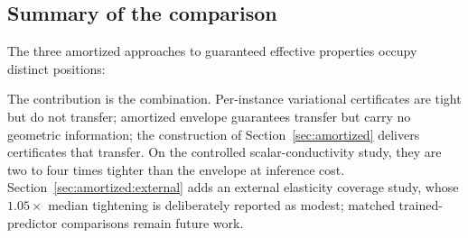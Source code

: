 \subsection{Summary of the comparison}
\label{sec:tightness:summary}

The three amortized approaches to guaranteed effective properties occupy
distinct positions:

\begin{center}
\end{center}

The contribution is the combination. Per-instance variational certificates
are tight but do not transfer; amortized envelope guarantees transfer but
carry no geometric information; the construction of
Section~\ref{sec:amortized} delivers certificates that transfer. On the
controlled scalar-conductivity study, they are two to four times tighter
than the envelope at inference cost. Section~\ref{sec:amortized:external}
adds an external elasticity coverage study, whose $1.05\times$ median
tightening is deliberately reported as modest; matched trained-predictor
comparisons remain future work.
